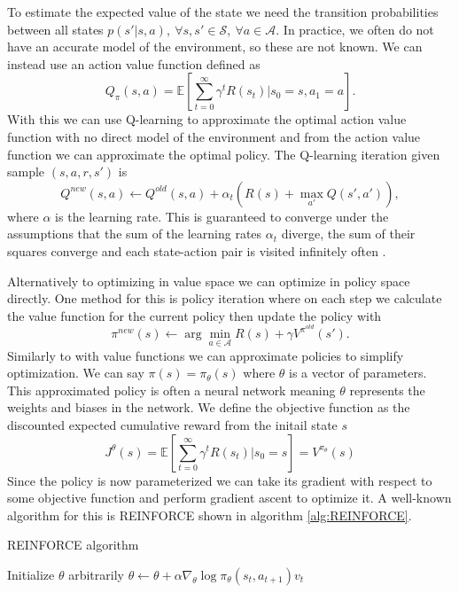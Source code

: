 To estimate the expected value of the state we need the transition probabilities between all states $p(s'|s,a), \ \forall s,s' \in \mathcal{S}, \ \forall a \in \mathcal{A}$. In practice, we often do not have an accurate model of the environment, so these are not known. We can instead use an action value function defined as 
\begin{equation*}
    Q_\pi(s,a) = \mathbb{E} [ \sum_{t=0}^\infty \gamma^t R(s_t)|s_0=s, a_1=a].
\end{equation*}
With this we can use Q-learning to approximate the optimal action value function with no direct model of the environment and from the action value function we can approximate the optimal policy. The Q-learning iteration given sample $(s,a,r,s')$ is 
\begin{equation*}
    Q^{new}(s,a) \leftarrow Q^{old}(s,a) + \alpha_t (R(s) + \max_{a'} Q(s',a')),
\end{equation*} 
where $\alpha$ is the learning rate. This is guaranteed to converge under the assumptions that the sum of the learning rates $\alpha_t$ diverge, the sum of their squares converge and each state-action pair is visited infinitely often \cite{QLearning}.

Alternatively to optimizing in value space we can optimize in policy space directly. One method for this is policy iteration where on each step we calculate the value function for the current policy then update the policy with 
\begin{equation*}
    \pi^{new}(s) \leftarrow \arg \min_{a \in \mathcal{A}} R(s) + \gamma V^{\pi^{old}}(s').
\end{equation*}
Similarly to with value functions we can approximate policies to simplify optimization. We can say $\pi(s) = \pi_\theta (s)$ where $\theta$ is a vector of parameters. This approximated policy is often a neural network meaning $\theta$ represents the weights and biases in the network. 
We define the objective function as the discounted expected cumulative reward from the initail state $s$ 
\begin{equation*}
    J^\theta(s) = \mathbb{E} [ \sum_{t=0}^\infty \gamma^t R(s_t)|s_0=s] = V^{\pi_\theta}(s)
\end{equation*}
Since the policy is now parameterized we can take its gradient with respect to some objective function and perform gradient ascent to optimize it. A well-known algorithm for this is REINFORCE \cite{REINFORCE} shown in algorithm \ref{alg:REINFORCE}.

\begin{algorithm}
    \caption{REINFORCE algorithm}\label{alg:REINFORCE}
    \begin{algorithmic}
            \State Initialize $\theta$ arbitrarily
                    \State $\theta \leftarrow \theta + \alpha \nabla_\theta \log \pi_\theta(s_t,a_{t+1})v_t$ 
                \EndFor
            \EndFor
    \end{algorithmic}
\end{algorithm}





